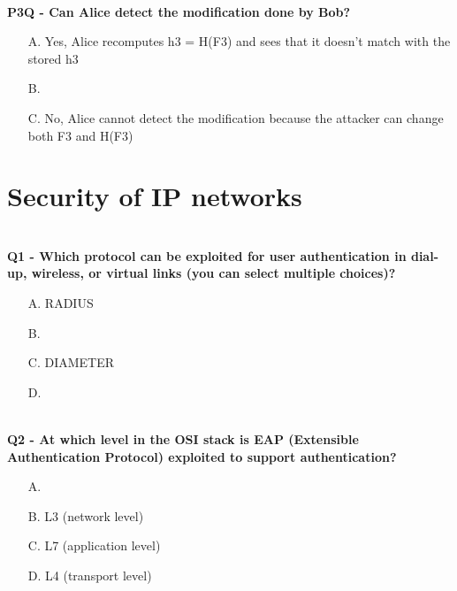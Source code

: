\textbf{\\P3Q - Can Alice detect the modification done by Bob?}
\begin{itemize}
    \item[A.] Yes, Alice recomputes h3 = H(F3) and sees that it doesn't match with the stored h3
    \item[B.] 
    \item[C.] No, Alice cannot detect the modification because the attacker can change both F3 and H(F3)
\end{itemize}

\section{Security of IP networks}
\textbf{\\Q1 - Which protocol can be exploited for user authentication in dial-up, wireless, or virtual links (you can select multiple choices)?}
\begin{itemize}
    \item[A.] RADIUS
    \item[B.] 
    \item[C.] DIAMETER
    \item[D.] 
\end{itemize}

\textbf{\\Q2 - At which level in the OSI stack is EAP (Extensible Authentication Protocol) exploited to support authentication?}
\begin{itemize}
    \item[A.] 
    \item[B.] L3 (network level)
    \item[C.] L7 (application level)
    \item[D.] L4 (transport level)
\end{itemize}

